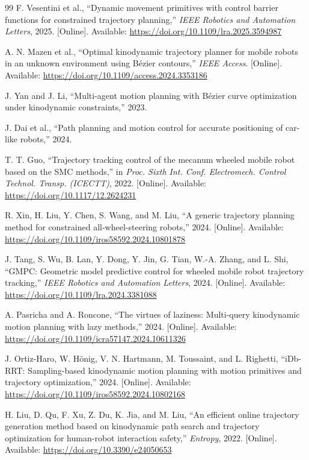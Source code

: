 \begin{thebibliography}{99}
F. Vesentini et al., ``Dynamic movement primitives with control barrier functions for constrained trajectory planning,'' \emph{IEEE Robotics and Automation Letters}, 2025. [Online]. Available: \url{https://doi.org/10.1109/lra.2025.3594987}

A. N. Mazen et al., ``Optimal kinodynamic trajectory planner for mobile robots in an unknown environment using Bézier contours,'' \emph{IEEE Access}. [Online]. Available: \url{https://doi.org/10.1109/access.2024.3353186}

J. Yan and J. Li, ``Multi-agent motion planning with Bézier curve optimization under kinodynamic constraints,'' 2023.

J. Dai et al., ``Path planning and motion control for accurate positioning of car-like robots,'' 2024.

T. T. Guo, ``Trajectory tracking control of the mecanum wheeled mobile robot based on the SMC methods,'' in \emph{Proc. Sixth Int. Conf. Electromech. Control Technol. Transp. (ICECTT)}, 2022. [Online]. Available: \url{https://doi.org/10.1117/12.2624231}

R. Xin, H. Liu, Y. Chen, S. Wang, and M. Liu, ``A generic trajectory planning method for constrained all-wheel-steering robots,'' 2024. [Online]. Available: \url{https://doi.org/10.1109/iros58592.2024.10801878}

J. Tang, S. Wu, B. Lan, Y. Dong, Y. Jin, G. Tian, W.-A. Zhang, and L. Shi, ``GMPC: Geometric model predictive control for wheeled mobile robot trajectory tracking,'' \emph{IEEE Robotics and Automation Letters}, 2024. [Online]. Available: \url{https://doi.org/10.1109/lra.2024.3381088}

A. Pasricha and A. Roncone, ``The virtues of laziness: Multi-query kinodynamic motion planning with lazy methods,'' 2024. [Online]. Available: \url{https://doi.org/10.1109/icra57147.2024.10611326}

J. Ortiz-Haro, W. Hönig, V. N. Hartmann, M. Toussaint, and L. Righetti, ``iDb-RRT: Sampling-based kinodynamic motion planning with motion primitives and trajectory optimization,'' 2024. [Online]. Available: \url{https://doi.org/10.1109/iros58592.2024.10802168}

H. Liu, D. Qu, F. Xu, Z. Du, K. Jia, and M. Liu, ``An efficient online trajectory generation method based on kinodynamic path search and trajectory optimization for human-robot interaction safety,'' \emph{Entropy}, 2022. [Online]. Available: \url{https://doi.org/10.3390/e24050653}


\end{thebibliography}
